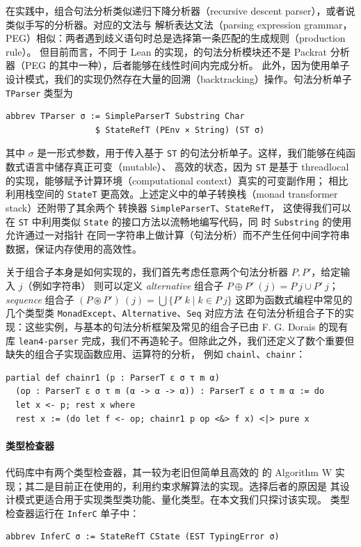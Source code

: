 在实践中，组合句法分析类似递归下降分析器（recursive descent parser），或者说类似手写的分析器。对应的文法与
解析表达文法（parsing expression grammar，PEG）相似：两者遇到歧义语句时总是选择第一条匹配的生成规则（production rule）。
但目前而言，不同于 Lean 的实现，\Tigris 的句法分析模块还不是 Packrat 分析器（PEG 的其中一种），后者能够在线性时间内完成分析。
此外，因为使用单子设计模式，我们的实现仍然存在大量的回溯（backtracking）操作。句法分析单子 \texttt{TParser} 类型为
\begin{verbatim}
abbrev TParser σ := SimpleParserT Substring Char
                  $ StateRefT (PEnv × String) (ST σ)
\end{verbatim}
其中 $\sigma$ 是一形式参数，用于传入基于 \texttt{ST} 的句法分析单子。这样，我们能够在纯函数式语言中储存真正可变（mutable）、
高效的状态，因为 \texttt{ST} 是基于 threadlocal 的实现，能够赋予计算环境（computational context）真实的可变副作用；
相比利用栈空间的 \texttt{StateT} 更高效。上述定义中的单子转换栈（monad transformer stack）还附带了其余两个
转换器 \texttt{SimpleParserT}、\texttt{StateRefT}，
这使得我们可以在 \texttt{ST} 中利用类似 \texttt{State} 的接口方法以流畅地编写代码，同
时 \texttt{Substring} 的使用允许通过一对指针
在同一字符串上做计算（句法分析）而不产生任何中间字符串数据，保证内存使用的高效性。

关于组合子本身是如何实现的，我们首先考虑任意两个句法分析器 $P, P'$，给定输入 $j$（例如字符串）
则可以定义 \emph{alternative} 组合子 \(P\oplus P'\ (j)=P\ j\cup P'\ j\)；
\emph{sequence} 组合子 \((P\circledast P')\ (j)=\bigcup \{P'\ k \mid k\in P\ j\}\)
这即为函数式编程中常见的几个类型类 \texttt{MonadExcept}、\texttt{Alternative}、\texttt{Seq} 对应方法
在句法分析组合子下的实现：这些实例，与基本的句法分析框架及常见的组合子已由 F. G. Dorais 的现有库
\texttt{lean4-parser} 完成，我们不再造轮子。但除此之外，我们还定义了数个重要但缺失的组合子实现函数应用、运算符的分析，
例如 \texttt{chainl}、\texttt{chainr}：
\begin{verbatim}
partial def chainr1 (p : ParserT ε σ τ m α)
  (op : ParserT ε σ τ m (α -> α -> α)) : ParserT ε σ τ m α := do
  let x <- p; rest x where
  rest x := (do let f <- op; chainr1 p op <&> f x) <|> pure x
\end{verbatim}
\paragraph{类型检查器} \Tigris 代码库中有两个类型检查器，其一较为老旧但简单且高效的
的 Algorithm W 实现；其二是目前正在使用的，利用约束求解算法的实现。选择后者的原因是
其设计模式更适合用于实现类型类功能、量化类型。在本文我们只探讨该实现。
类型检查器运行在 \texttt{InferC} 单子中：
\begin{verbatim}
abbrev InferC σ := StateRefT CState (EST TypingError σ)
\end{verbatim}

